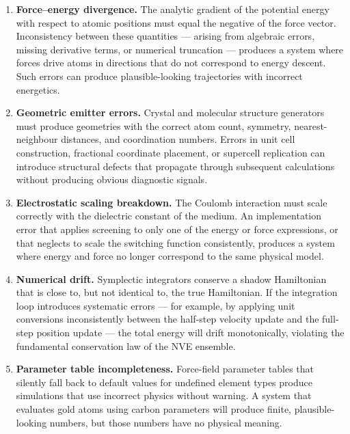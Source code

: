 \documentclass[11pt,twoside]{article}
\begin{document}
\begin{enumerate}
  \item \textbf{Force--energy divergence.} The analytic gradient of the potential energy with respect to atomic positions must equal the negative of the force vector. Inconsistency between these quantities --- arising from algebraic errors, missing derivative terms, or numerical truncation --- produces a system where forces drive atoms in directions that do not correspond to energy descent. Such errors can produce plausible-looking trajectories with incorrect energetics.

  \item \textbf{Geometric emitter errors.} Crystal and molecular structure generators must produce geometries with the correct atom count, symmetry, nearest-neighbour distances, and coordination numbers. Errors in unit cell construction, fractional coordinate placement, or supercell replication can introduce structural defects that propagate through subsequent calculations without producing obvious diagnostic signals.

  \item \textbf{Electrostatic scaling breakdown.} The Coulomb interaction must scale correctly with the dielectric constant of the medium. An implementation error that applies screening to only one of the energy or force expressions, or that neglects to scale the switching function consistently, produces a system where energy and force no longer correspond to the same physical model.

  \item \textbf{Numerical drift.} Symplectic integrators conserve a shadow Hamiltonian that is close to, but not identical to, the true Hamiltonian. If the integration loop introduces systematic errors --- for example, by applying unit conversions inconsistently between the half-step velocity update and the full-step position update --- the total energy will drift monotonically, violating the fundamental conservation law of the NVE ensemble.

  \item \textbf{Parameter table incompleteness.} Force-field parameter tables that silently fall back to default values for undefined element types produce simulations that use incorrect physics without warning. A system that evaluates gold atoms using carbon parameters will produce finite, plausible-looking numbers, but those numbers have no physical meaning.
\end{enumerate}
\end{document}
